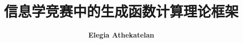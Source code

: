 \documentclass[12pt]{ctexart}
\title{\textbf{\Huge 信息学竞赛中的生成函数计算理论框架%
}}
\author{\textbf{Elegia\textsuperscript{\textasteriskcentered} Athekatelan\textsuperscript{\textdagger}}}
\date{}
\theoremstyle{plain}
\theoremstyle{definition}
\newif\ifcont
\begin{document}
\maketitle

\conttrue


\end{document}
